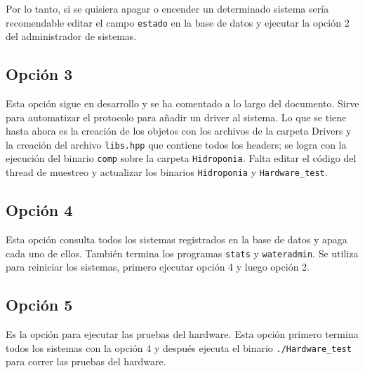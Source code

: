 \documentclass[a4paper,10pt,titlepage]{article}
\begin{document}
Por lo tanto, si se quisiera apagar o encender un determinado sistema ser\'ia 
recomendable editar el campo \verb|estado| en la base de datos y ejecutar la opci\'on 2 del administrador de sistemas.

\subsection{Opci\'on 3}
Esta opci\'on sigue en desarrollo y se ha comentado a lo largo del documento. Sirve para automatizar el protocolo para a\~nadir un driver al sistema. Lo que se tiene hasta 
ahora es la creaci\'on de los objetos con los archivos de la carpeta Drivers y la creaci\'on del archivo \verb|libs.hpp| que 
contiene todos los headers; se logra con la ejecuci\'on del binario \verb|comp| sobre la carpeta \verb|Hidroponia|. Falta editar el c\'odigo del thread de muestreo y 
actualizar los binarios \verb|Hidroponia| y 
\verb|Hardware_test|.

\subsection{Opci\'on 4}
Esta opci\'on consulta todos los sistemas registrados en la base de datos y apaga cada uno de ellos. Tambi\'en termina los programas \verb|stats| y \verb|wateradmin|. 
Se utiliza para reiniciar los sistemas, primero ejecutar opci\'on 4 y luego opci\'on 2.

\subsection{Opci\'on 5}
Es la opci\'on para ejecutar las pruebas del hardware. Esta opci\'on primero termina todos los sistemas con la opci\'on 4 y despu\'es ejecuta el 
binario \verb|./Hardware_test| para correr las pruebas del hardware.
\end{document}
